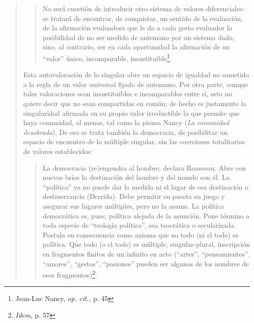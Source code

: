 \begin{quote}
\begin{quote}
No será cuestión de introducir otro sistema de valores diferenciales: se tratará de encontrar, de conquistar, un sentido de la evaluación, de la afirmación evaluadora que le da a cada gesto evaluador  la posibilidad de no ser medido de antemano por un sistema dado, sino, al contrario, ser en cada oportunidad la afirmación de un \enquote{valor}  único, incomparable, insustituible\footnote{Jean-Luc Nancy, \emph{op. cit.,} p. 45}.
\end{quote}

Esta autovaloración de lo singular abre un espacio de igualdad no sometido a la regla de un valor universal fijado de antemano. Por otra parte, aunque tales valoraciones sean insustituibles e incomparables entre sí, esto no quiere decir que no sean compartidas en común; de hecho es justamente la singularidad afirmada en su propio valor irreductible la que permite que haya comunidad, al menos, tal como la piensa Nancy (\emph{La comunidad desobrada}). De eso se trata también la democracia, de posibilitar un espacio de encuentro de lo múltiple singular, sin las coerciones totalitarias de valores establecidos:

\begin{quote}
La democracia (re)engendra al hombre, declara Rousseau. Abre con nuevos bríos la destinación del hombre y del mundo con él. La \enquote{política} ya no puede dar la medida ni el lugar de esa destinación o destinerrancia (Derrida). Debe permitir su puesta en juego y asegurar sus lugares múltiples, pero no la asume. La política democrática es, pues, política alejada de la asunción. Pone término a toda especie de \enquote{teología política}, sea teocrática o secularizada. Postula en consecuencia como axioma que no todo (ni el todo) es política. Que todo (o el todo) es múltiple, singular-plural, inscripción en fragmentos finitos de un infinito en acto (\enquote{artes}, \enquote{pensamientos}, \enquote{amores}, \enquote{gestos}, \enquote{pasiones} pueden ser algunos de los nombres de esos fragmentos)\footnote{\emph{Idem,} p. 57}.
\end{quote}


\end{quote}
